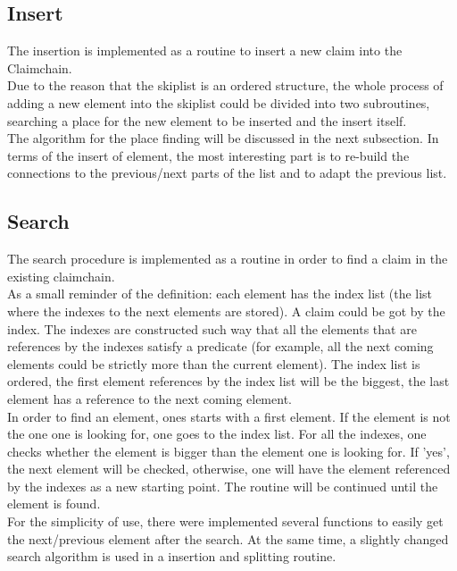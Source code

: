 \documentclass[a4paper]{article}
\begin{document}
\subsection{Insert}
The insertion is implemented as a routine to insert a new claim into the Claimchain. \\
Due to the reason that the skiplist is an ordered structure, the whole process of adding a new element into the skiplist could be divided into two subroutines, searching a place for the new element to be inserted and the insert itself. \\ The algorithm for the place finding will be discussed in the next subsection. 
In terms of the insert of element, the most interesting part is to re-build the connections to the previous/next parts of the list and to adapt the previous list. \\
\subsection{Search}
The search procedure is implemented as a routine in order to find a claim in the existing claimchain. \\
As a small reminder of the definition: each element has the index list (the list where the indexes to the next elements are stored). A claim could be got by the index. The indexes are constructed such way that all the elements that are references by the indexes satisfy a predicate (for example, all the next coming elements could be strictly more than the current element). The index list is ordered, the first element references by the index list will be the biggest, the last element has a reference to the next coming element. \\
In order to find an element, ones starts with a first element. If the element is not the one one is looking for, one goes to the index list. For all the indexes, one checks whether the element is bigger than the element one is looking for. If 'yes', the next element will be checked, otherwise, one will have the element referenced by the indexes as a new starting point. The routine will be continued until the element is found. \\
For the simplicity of use, there were implemented several functions to easily get the next/previous element after the search. At the same time, a slightly changed search algorithm is used in a insertion and splitting routine. \\ 
\end{document}
